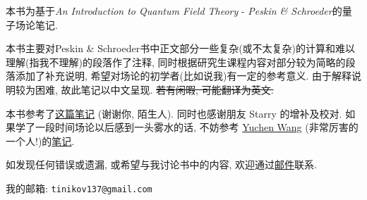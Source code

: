 
\begin{spacing}{1.8}
  本书为基于\textit{An Introduction to Quantum Field Theory} - \textit{Peskin \& Schroeder}的量子场论笔记.

  \mbox{}

  本书主要对Peskin \& Schroeder书中正文部分一些复杂(或不太复杂)的计算和难以理解(指我不理解)的段落作了注释, 同时根据研究生课程内容对部分较为简略的段落添加了补充说明, 希望对场论的初学者(比如说我)有一定的参考意义.
  由于解释说明较为困难, 故此笔记以中文呈现.
  \sout{若有闲暇, 可能翻译为英文. }

  \mbox{}

  本书参考了\href{http://gamebm.shoutwiki.com/wiki/Lecture_Notes_of_An_Introduction_to_Quantum_Field_Theory_by_M._Peskin_and_D._Schroeder}{这篇笔记} (谢谢你, 陌生人).
  同时也感谢朋友 Starry 的增补及校对.
  如果学了一段时间场论以后感到一头雾水的话, 不妨参考 \href{https://yuchenw.blog}{Yuchen Wang} (非常厉害的一个人!)的\href{https://yuchenw.blog/qft-notes}{笔记}.

  \mbox{}

  如发现任何错误或遗漏, 或希望与我讨论书中的内容, 欢迎通过\href{mailto:tinikov137@gmail.com}{邮件}联系.

  我的邮箱: \texttt{tinikov137@gmail.com}
\end{spacing}
\pagestyle{general}